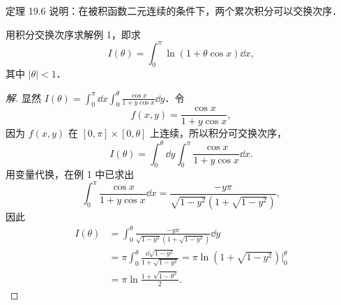 定理 19.6 说明：在被积函数二元连续的条件下，两个累次积分可以交换次序．

\begin{example}\label{ex:19-1-5}
用积分交换次序求解例 1，即求
\[
I(\theta)=\int_{0}^{\pi}\ln(1+\theta\cos x)\dd x,
\]
其中 $|\theta|<1$．
\end{example}

\begin{proof}[解]
显然 $I(\theta)=\displaystyle\int_{0}^{\pi}\dd x\int_{0}^{\theta}\frac{\cos x}{1+y\cos x}\dd y$．令
\[
f(x,y)=\frac{\cos x}{1+y\cos x},
\]
因为 $f(x,y)$ 在 $[0,\pi]\times[0,\theta]$ 上连续，所以积分可交换次序，
\[
I(\theta)=\int_{0}^{\theta}\dd y\int_{0}^{\pi}\frac{\cos x}{1+y\cos x}\dd x.
\]
用变量代换，在例 1 中已求出
\[
\int_{0}^{\pi}\frac{\cos x}{1+y\cos x}\dd x=\frac{-y\pi}{\sqrt{1-y^{2}}\left(1+\sqrt{1-y^{2}}\right)},
\]
因此
\[
\begin{aligned}
I(\theta)&=\int_{0}^{\theta}\frac{-y\pi}{\sqrt{1-y^{2}}\left(1+\sqrt{1-y^{2}}\right)}\dd y\\
&=\pi\int_{0}^{\theta}\frac{\dd\sqrt{1-y^{2}}}{1+\sqrt{1-y^{2}}}=\pi\ln\left(1+\sqrt{1-y^{2}}\right)\bigg|_{0}^{\theta}\\
&=\pi\ln\frac{1+\sqrt{1-\theta^{2}}}{2}.
\end{aligned}
\]
\end{proof}

